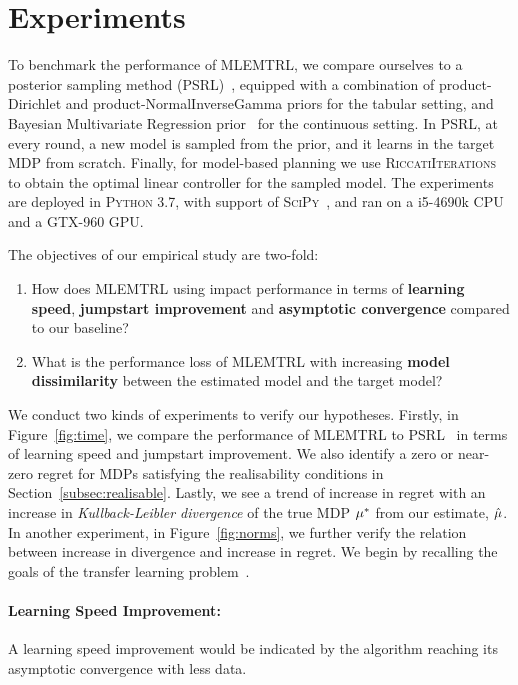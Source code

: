 \section{Experiments}\label{sec:experiments}

To benchmark the performance of MLEMTRL, we compare ourselves to a posterior sampling method (PSRL)~\citep{osband2013more}, equipped with a combination of product-Dirichlet and product-NormalInverseGamma priors for the tabular setting, and Bayesian Multivariate Regression prior~\citep{minka2000bayesian} for the continuous setting. In PSRL, at every round, a new model is sampled from the prior, and it learns in the target MDP from scratch. Finally, for model-based planning we use \textsc{RiccatiIterations}~\citep{willems1971least} to obtain the optimal linear controller for the sampled model. The experiments are deployed in \textsc{Python 3.7}, with support of \textsc{SciPy}~\citep{virtanen2020scipy}, and ran on a i5-4690k CPU and a GTX-960 GPU. 

The objectives of our empirical study are two-fold:
\begin{enumerate}
    \item How does \textsc{MLEMTRL} using impact performance in terms of \textbf{learning speed}, \textbf{jumpstart improvement} and \textbf{asymptotic convergence} compared to our baseline?
    \item What is the performance loss of \textsc{MLEMTRL} with increasing \textbf{model dissimilarity} between the estimated model and the target model?
\end{enumerate}

We conduct two kinds of experiments to verify our hypotheses. Firstly, in Figure~\ref{fig:time}, we compare the performance of MLEMTRL to PSRL~\citep{osband2013more} in terms of learning speed and jumpstart improvement. We also identify a zero or near-zero regret for MDPs satisfying the realisability conditions in Section~\ref{subsec:realisable}. Lastly, we see a trend of increase in regret with an increase in \emph{Kullback-Leibler divergence} of the true MDP $\mu^{*}$ from our estimate, $\hat{\mu}$. In another experiment, in Figure~\ref{fig:norms}, we further verify the relation between increase in divergence and increase in regret. We begin by recalling the goals of the transfer learning problem~\citep{langley2006transfer}.

\paragraph{Learning Speed Improvement:}
A learning speed improvement would be indicated by the algorithm reaching its asymptotic convergence with less data.
